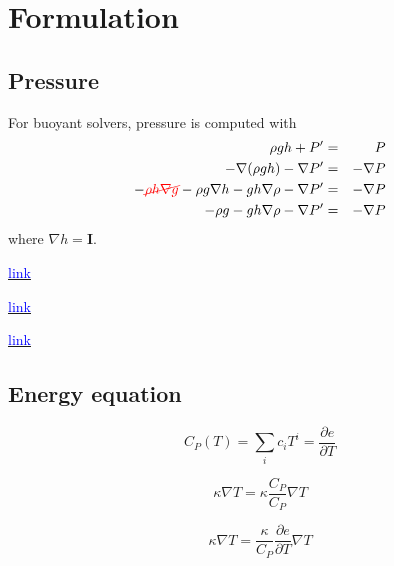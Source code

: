 \documentclass[a4paper, 12pt]{article}
\numberwithin{equation}{section}
\newcommand{\blue}[1]{\textcolor{blue}{#1}}
\newcommand{\red}[1]{\textcolor{red}{#1}}
\begin{document}
\clearpage
\section{Formulation}

    \subsection{Pressure}

        For buoyant solvers, pressure is computed with
        \begin{eqnarray}
        \rho g h + P' &=& P \\
        - \nabla(\rho g h) - \nabla P' &=& - \nabla P \\
        - \red{\cancel{\rho h \nabla g}} - \rho g \nabla h - g h \nabla \rho - \nabla P' &=& - \nabla P \\
        - \rho g - g h \nabla \rho - \nabla P' &=& - \nabla P
        \end{eqnarray}
        where $\nabla h = \mathbf{I}$.

        \href{
        https://www.cfd-online.com/Forums/openfoam-solving/219609-rho-buoyant-solver-p-p\_rgh-ph\_rgh.html
        }{\blue{link}}

        \href{
        https://www.openfoam.com/documentation/guides/latest/api/prghTotalHydrostaticPressureFvPatchScalarField\_8H\_source.html
        }{\blue{link}}

        \href{
        https://www.openfoam.com/documentation/guides/latest/api/classFoam\_1\_1prghTotalHydrostaticPressureFvPatchScalarField.html
        }{\blue{link}}

    \subsection{Energy equation}

        \begin{equation}
        C_P (T) = \sum_i c_i T^i = \frac{\partial e}{\partial T}
        \end{equation}

        \begin{equation}
        \kappa \nabla T = \kappa \frac{C_P}{C_P} \nabla T
        \end{equation}

        \begin{equation}
        \kappa \nabla T = \frac{\kappa}{C_P} \frac{\partial e}{\partial T} \nabla T
        \end{equation}
\end{document}
